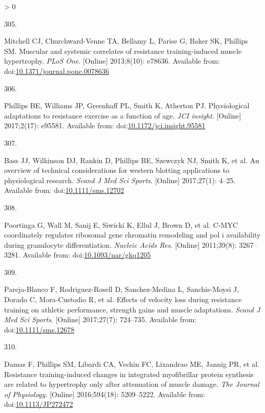 \documentclass[twoside,10pt]{gihclass} %
\newlength{\cslhangindent}
\newlength{\csllabelwidth}
\newenvironment{CSLReferences}[3] %
 {%
  \setlength{\parindent}{0pt}
  \ifodd #1 \everypar{\setlength{\hangindent}{\cslhangindent}}\ignorespaces\fi
  \ifnum #2 > 0
  \setlength{\parskip}{#2\baselineskip}
  \fi
 }%
 {}
\newcommand{\CSLLeftMargin}[1]{\parbox[t]{\maxof{\widthof{#1}}{\csllabelwidth}}{#1}}
\newcommand{\CSLRightInline}[1]{\parbox[t]{\linewidth}{#1}}
\begin{document}
\begin{CSLReferences}{0}{0}
\leavevmode\hypertarget{ref-RN788}{}%
\CSLLeftMargin{305. }
\CSLRightInline{Mitchell CJ, Churchward-Venne TA, Bellamy L, Parise G, Baker SK, Phillips SM. Muscular and systemic correlates of resistance training-induced muscle hypertrophy. \emph{PLoS One}. {[}Online{]} 2013;8(10): e78636. Available from: doi:\href{https://doi.org/10.1371/journal.pone.0078636}{10.1371/journal.pone.0078636}}

\leavevmode\hypertarget{ref-RN2171}{}%
\CSLLeftMargin{306. }
\CSLRightInline{Phillips BE, Williams JP, Greenhaff PL, Smith K, Atherton PJ. Physiological adaptations to resistance exercise as a function of age. \emph{JCI insight}. {[}Online{]} 2017;2(17): e95581. Available from: doi:\href{https://doi.org/10.1172/jci.insight.95581}{10.1172/jci.insight.95581}}

\leavevmode\hypertarget{ref-RN1942}{}%
\CSLLeftMargin{307. }
\CSLRightInline{Bass JJ, Wilkinson DJ, Rankin D, Phillips BE, Szewczyk NJ, Smith K, et al. An overview of technical considerations for western blotting applications to physiological research. \emph{Scand J Med Sci Sports}. {[}Online{]} 2017;27(1): 4--25. Available from: doi:\href{https://doi.org/10.1111/sms.12702}{10.1111/sms.12702}}

\leavevmode\hypertarget{ref-RN1832}{}%
\CSLLeftMargin{308. }
\CSLRightInline{Poortinga G, Wall M, Sanij E, Siwicki K, Ellul J, Brown D, et al. C-MYC coordinately regulates ribosomal gene chromatin remodeling and pol i availability during granulocyte differentiation. \emph{Nucleic Acids Res}. {[}Online{]} 2011;39(8): 3267--3281. Available from: doi:\href{https://doi.org/10.1093/nar/gkq1205}{10.1093/nar/gkq1205}}

\leavevmode\hypertarget{ref-RN2217}{}%
\CSLLeftMargin{309. }
\CSLRightInline{Pareja-Blanco F, Rodriguez-Rosell D, Sanchez-Medina L, Sanchis-Moysi J, Dorado C, Mora-Custodio R, et al. Effects of velocity loss during resistance training on athletic performance, strength gains and muscle adaptations. \emph{Scand J Med Sci Sports}. {[}Online{]} 2017;27(7): 724--735. Available from: doi:\href{https://doi.org/10.1111/sms.12678}{10.1111/sms.12678}}

\leavevmode\hypertarget{ref-RN2144}{}%
\CSLLeftMargin{310. }
\CSLRightInline{Damas F, Phillips SM, Libardi CA, Vechin FC, Lixandrao ME, Jannig PR, et al. Resistance training-induced changes in integrated myofibrillar protein synthesis are related to hypertrophy only after attenuation of muscle damage. \emph{The Journal of Physiology}. {[}Online{]} 2016;594(18): 5209--5222. Available from: doi:\href{https://doi.org/10.1113/JP272472}{10.1113/JP272472}}


\end{CSLReferences}
\end{document}
